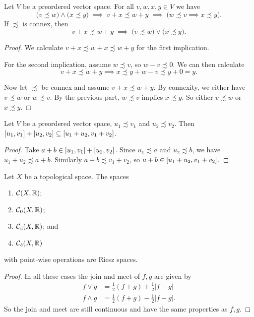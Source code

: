 \begin{lemma} \label{additionVectorInequalities}
Let $V$ be a preordered vector space. For all $v,w, x, y \in V$ we have
\[ \big(v \precsim w\big) \land \big(x \precsim y\big) \;\implies\; v+ x \precsim w+y \;\implies\; \Big( w \precsim v \implies x\precsim y\Big). \]
If $\precsim$ is connex, then
\[ v+ x \precsim w+y \;\implies\; \big(v\precsim w\big)\lor\big( x\precsim y\big). \]
\end{lemma}
\begin{proof}
We calculate $v + x \precsim w + x \precsim w+y$ for the first implication.

For the second implication, assume $w\precsim v$, so $w-v \precsim 0$. We can then calculate
\[ v+ x \precsim w+y \implies x\precsim y + w - v \precsim y + 0 = y. \]

Now let $\precsim$ be connex and assume $v+ x \precsim w+y$. By connexity, we either have $v\precsim w$ or $w\precsim v$. By the previous part, $w\precsim v$ implies $x\precsim y$. So either $v\precsim w$ or $x\precsim y$.
\end{proof}
\begin{corollary} \label{intervalSumInclusion}
Let $V$ be a preordered vector space, $u_1\precsim v_1$ and $u_2 \precsim v_2$. Then $\interval{u_1, v_1} + \interval{u_2, v_2} \subseteq \interval{u_1 + u_2, v_1+ v_2}$.
\end{corollary}
\begin{proof}
Take $a+ b \in \interval{u_1, v_1} + \interval{u_2, v_2}$. Since $u_1 \precsim a$ and $u_2 \precsim b$, we have $u_1 + u_2 \precsim a+b$. Similarly $a+b \precsim v_1 + v_2$, so $a+b \in \interval{u_1 + u_2, v_1+ v_2}$.
\end{proof}

\begin{lemma}
Let $X$ be a topological space. The spaces
\begin{enumerate}
\item $\operatorname{\mathcal{C}}(X,\mathbb{R})$;
\item $\operatorname{\mathcal{C}}_0(X,\mathbb{R})$;
\item $\operatorname{\mathcal{C}}_c(X,\mathbb{R})$; and
\item $\operatorname{\mathcal{C}}_b(X,\mathbb{R})$
\end{enumerate}
with point-wise operations are Riesz spaces.
\end{lemma}
\begin{proof}
In all these cases the join and meet of $f,g$ are given by
\begin{align*}
f \vee g &= \frac{1}{2}(f+g)+ \frac{1}{2}|f-g| \\
f \wedge g &= \frac{1}{2}(f+g) - \frac{1}{2}|f-g|.
\end{align*}
So the join and meet are still continuous and have the same properties as $f,g$.
\end{proof}

